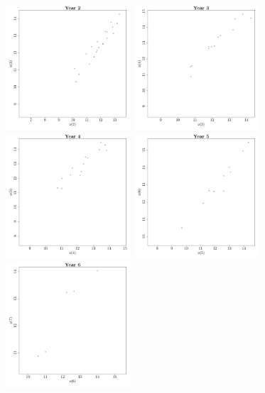\documentclass{article}\usepackage[]{graphicx}\usepackage[]{color}
\newenvironment{knitrout}{}{} %
\begin{document}
\begin{knitrout}
\includegraphics[width=0.35\textwidth]{figure/Reshaping2} 
\includegraphics[width=0.35\textwidth]{figure/Reshaping3} 
\includegraphics[width=0.35\textwidth]{figure/Reshaping4} 
\includegraphics[width=0.35\textwidth]{figure/Reshaping5} 
\includegraphics[width=0.35\textwidth]{figure/Reshaping6} 

\end{knitrout}
\end{document}
